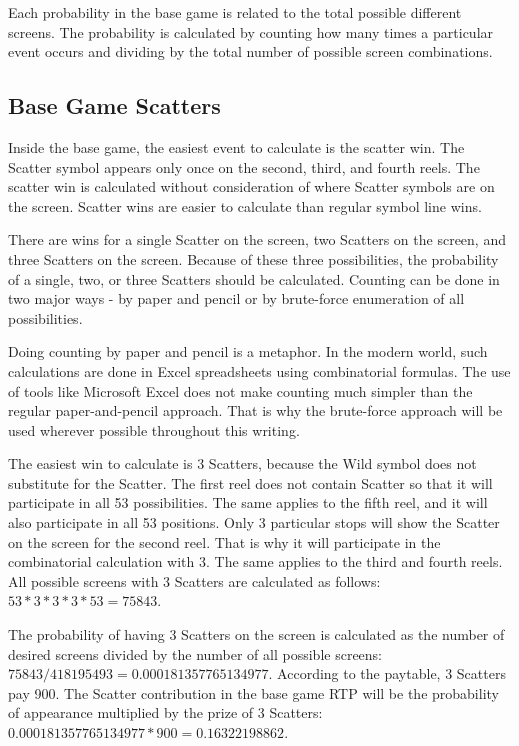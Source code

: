 \documentclass[12pt,twoside,openany]{book}
\begin{document}
Each probability in the base game is related to the total possible different screens. The probability is calculated by counting how many times a particular event occurs and dividing by the total number of possible screen combinations.

\subsection*{Base Game Scatters}

Inside the base game, the easiest event to calculate is the scatter win. The Scatter symbol appears only once on the second, third, and fourth reels. The scatter win is calculated without consideration of where Scatter symbols are on the screen. Scatter wins are easier to calculate than regular symbol line wins.

There are wins for a single Scatter on the screen, two Scatters on the screen, and three Scatters on the screen. Because of these three possibilities, the probability of a single, two, or three Scatters should be calculated. Counting can be done in two major ways - by paper and pencil or by brute-force enumeration of all possibilities.

Doing counting by paper and pencil is a metaphor. In the modern world, such calculations are done in Excel spreadsheets using combinatorial formulas. The use of tools like Microsoft Excel does not make counting much simpler than the regular paper-and-pencil approach. That is why the brute-force approach will be used wherever possible throughout this writing.

The easiest win to calculate is 3 Scatters, because the Wild symbol does not substitute for the Scatter. The first reel does not contain Scatter so that it will participate in all 53 possibilities. The same applies to the fifth reel, and it will also participate in all 53 positions. Only 3 particular stops will show the Scatter on the screen for the second reel. That is why it will participate in the combinatorial calculation with 3. The same applies to the third and fourth reels. All possible screens with 3 Scatters are calculated as follows: $53 * 3 * 3 * 3 * 53 = 75843$.

The probability of having 3 Scatters on the screen is calculated as the number of desired screens divided by the number of all possible screens: $75843 / 418195493 =  0.000181357765134977$. According to the paytable, 3 Scatters pay 900. The Scatter contribution in the base game RTP will be the probability of appearance multiplied by the prize of 3 Scatters: $0.000181357765134977 * 900 = 0.16322198862$.
\end{document}
